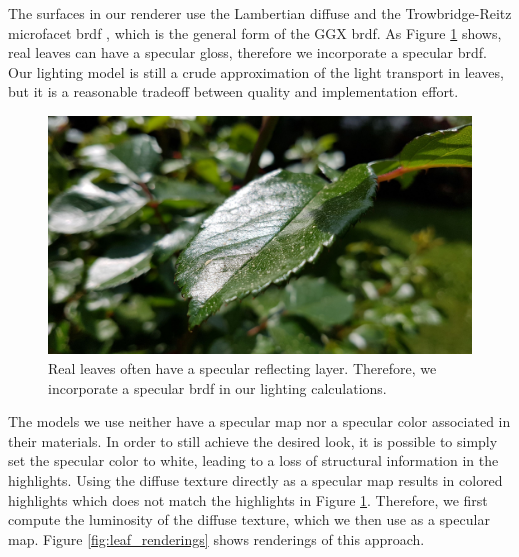 The surfaces in our renderer use the Lambertian diffuse \cite{lambert} and the Trowbridge-Reitz microfacet \ac{brdf} \cite{trowbridge_reitz}, which is the general form of the GGX \ac{brdf}.
As Figure \ref{fig:leaf_gloss} shows, real leaves can have a specular gloss, therefore we incorporate a specular \ac{brdf}.
Our lighting model is still a crude approximation of the light transport in leaves, but it is a reasonable tradeoff between quality and implementation effort.
\begin{figure}[t]
    \centering
    \includegraphics[width=0.5\linewidth]{img/leaf_gloss.jpg}
    \caption[Leaf with glossy surface]{Real leaves often have a specular reflecting layer. Therefore, we incorporate a specular \ac{brdf} in our lighting calculations.}
    \label{fig:leaf_gloss}
\end{figure} 
The models we use neither have a specular map nor a specular color associated in their materials.
In order to still achieve the desired look, it is possible to simply set the specular color to white, leading to a loss of structural information in the highlights.
Using the diffuse texture directly as a specular map results in colored highlights which does not match the highlights in Figure \ref{fig:leaf_gloss}.
Therefore, we first compute the luminosity of the diffuse texture, which we then use as a specular map.
Figure \ref{fig:leaf_renderings} shows renderings of this approach.
